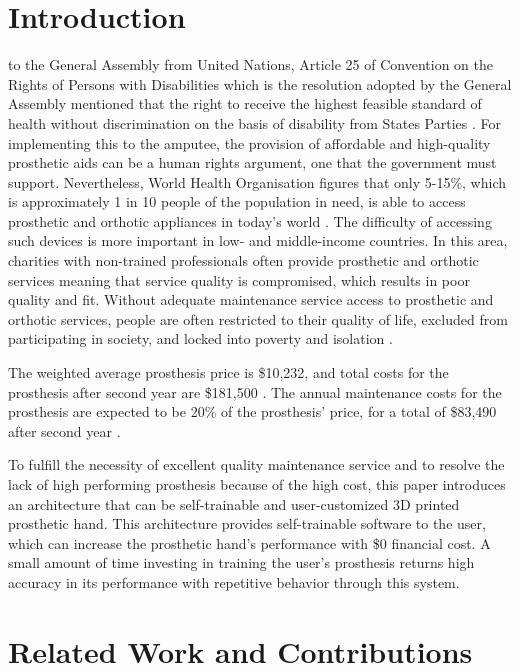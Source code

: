\documentclass[conference]{IEEEtran}
\begin{document}
\section{Introduction}
 to the General Assembly from United Nations, Article 25 of Convention on the Rights of Persons with Disabilities which is the resolution adopted by the General Assembly mentioned that the right to receive the highest feasible standard of health without discrimination on the basis of disability from States Parties \cite{UN}. For implementing this to the amputee, the provision of affordable and high-quality prosthetic aids can be a human rights argument, one that the government must support. Nevertheless, World Health Organisation figures that only 5-15\%, which is approximately 1 in 10 people of the population in need, is able to access prosthetic and orthotic appliances in today's world \cite{WHO}. The difficulty of accessing such devices is more important in low- and middle-income countries. In this area, charities with non-trained professionals often provide prosthetic and orthotic services meaning that service quality is compromised, which results in poor quality and fit. Without adequate maintenance service access to prosthetic and orthotic services, people are often restricted to their quality of life, excluded from participating in society, and locked into poverty and isolation \cite{WHO}.

The weighted average prosthesis price is \$10,232, and total costs for the prosthesis after second year are \$181,500 \cite{cost}. The annual maintenance costs for the prosthesis are expected to be 20\% of the prosthesis' price, for a total of \$83,490 after second year \cite{cost}.

To fulfill the necessity of excellent quality maintenance service and to resolve the lack of high performing prosthesis because of the high cost, this paper introduces an architecture that can be self-trainable and user-customized 3D printed prosthetic hand. This architecture provides self-trainable software to the user, which can increase the prosthetic hand's performance with \$0 financial cost. A small amount of time investing in training the user's prosthesis returns high accuracy in its performance with repetitive behavior through this system.




\section{Related Work and Contributions}
\end{document}
